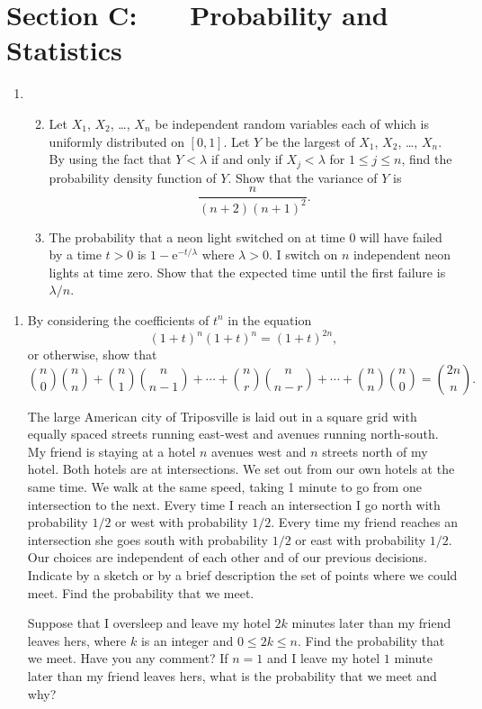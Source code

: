 \documentclass[a4, 11pt]{report}
\newlength{\qspace}
\newcounter{qnumber}
\newenvironment{question}%
 {\vspace{\qspace}
  \begin{enumerate}[\bfseries 1\quad][10]%
    \setcounter{enumi}{\value{qnumber}}%
    \item%
 }
{
  \end{enumerate}
  \filbreak
  \stepcounter{qnumber}
 }
\newenvironment{questionparts}[1][1]%
 {
  \begin{enumerate}[\bfseries (i)]%
    \setcounter{enumii}{#1}
    \addtocounter{enumii}{-1}
    \setlength{\itemsep}{5mm}
    \setlength{\parskip}{8pt}
 }
 {
  \end{enumerate}
 }
\begin{document}
	
	\newpage
\section*{Section C: \ \ \ Probability and Statistics}


\begin{question}
\begin{questionparts} 
\item Let $X_{1}$, $X_{2}$, \dots, $X_{n}$
be independent
random variables each of which is
uniformly distributed on $[0,1]$.
Let $Y$ be the
largest of $X_{1}$, $X_{2}$, \dots, $X_{n}$. By using the fact
that $Y<\lambda$ if and only if $X_{j}<\lambda$ for
$1\leqslant j\leqslant n$, find the probability density function of $Y$.
Show that the variance of $Y$
is 
\[\frac{n}{(n+2)(n+1)^{2}}.\]

\item 
The probability that a neon light switched on at time $0$ will have failed
by a time $t>0$ is $1-\mathrm{e}^{-t/\lambda}$ where $\lambda>0$. I switch
on $n$ independent neon lights at time zero. Show that the expected time
until the first failure is $\lambda/n$.
\end{questionparts}
\end{question}

\begin{question}
By considering the coefficients of $t^{n}$
in the equation
\[(1+t)^{n}(1+t)^{n}=(1+t)^{2n},\]
or otherwise,
show that
\[\binom{n}{0}\binom{n}{n}+\binom{n}{1}\binom{n}{n-1}+\cdots
+\binom{n}{r}\binom{n}{n-r}+\cdots+\binom{n}{n}\binom{n}{0}
=\binom{2n}{n}.\]

The large American city of Triposville is laid out in
a square grid with equally
spaced streets running east-west and avenues
running north-south. My friend is staying
at a hotel $n$ avenues west and $n$  streets north
of my hotel. Both hotels are at intersections.
We set out from our own hotels at the same
time. We walk at the same speed, taking 1 minute to go from
one intersection to the next. Every time I reach an intersection 
I go north with probability $1/2$ or west with probability
$1/2$. Every time my friend reaches an intersection 
she goes south with probability $1/2$ or east with probability
$1/2$. Our choices are independent of each other
and of our previous decisions.
Indicate by a sketch or by a brief description
the set of points where we could meet. Find the
probability that we meet.

Suppose that I oversleep and leave my hotel $2k$ minutes
later than my friend leaves hers, 
where $k$ is an integer and $0\leqslant 2k\leqslant n$. 
Find the probability
that we meet. Have you any comment?
If $n=1$ and I leave my hotel $1$ minute later than my friend
leaves hers, what is the probability that we meet and why?
\end{question}
\end{document}
